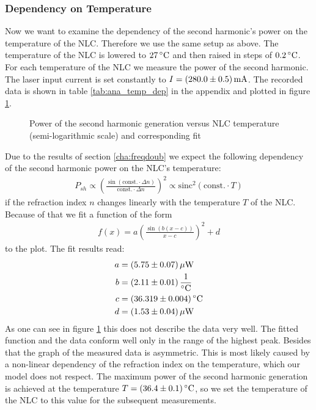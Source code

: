 \documentclass{protokoll_en}
\begin{document}
\subsubsection{Dependency on Temperature}
\label{subsubsec:ana_temp_dep}
Now we want to examine the dependency of the second harmonic's power on the temperature of the NLC. Therefore we use the same setup as above. The temperature of the NLC is lowered to $\unit[27]{^\circ C}$ and then raised in steps of $\unit[0.2]{^\circ C}$. For each temperature of the NLC we measure the power of the second harmonic. The laser input current is set constantly to $I=\unit[(280.0 \pm 0.5)]{mA}$. The recorded data is shown in table \ref{tab:ana_temp_dep} in the appendix and plotted in figure \ref{fig:ana_temp_dep}.
\begin{figure}[H]
  \resizebox{0.8\textwidth}{!}{
     
}
  \caption{Power of the second harmonic generation versus NLC temperature (semi-logarithmic scale) and corresponding fit}
  \label{fig:ana_temp_dep}
\end{figure}
Due to the results of section \ref{cha:freqdoub} we expect the following dependency of the second harmonic power on the NLC's temperature:
\begin{align}
P_{sh} \propto \left( \frac{\sin\left(\textrm{const.} \cdotp \Delta n\right)}{\textrm{const.}\cdotp \Delta n}\right)^2 \propto \textrm{sinc}^2\left(\textrm{const.}\cdotp T\right)
\end{align}
if the refraction index $n$ changes linearly with the temperature $T$ of the NLC. Because of that we fit a function of the form
\begin{align}
f(x) = a\left(\frac{\sin\left(b(x-c)\right)}{x-c}\right)^2+d
\end{align}
to the plot. The fit results read:
\begin{align}
a &= \unit[(5.75 \pm 0.07)]{\mu W}\\
\notag b &= \unit[(2.11 \pm 0.01)]{\frac{1}{^\circ C}}\\
\notag c &= \unit[(36.319 \pm 0.004)]{^\circ C}\\
\notag d &= \unit[(1.53 \pm 0.04)]{\mu W}
\end{align}
As one can see in figure \ref{fig:ana_temp_dep} this does not describe the data very well. The fitted function and the data conform well only in the range of the highest peak. Besides that the graph of the measured data is asymmetric. This is most likely caused by a non-linear dependency of the refraction index on the temperature, which our model does not respect. The maximum power of the second harmonic generation is achieved at the temperature $T=\unit[(36.4 \pm 0.1)]{^\circ C}$, so we set the temperature of the NLC to this value for the subsequent measurements.
\end{document}
